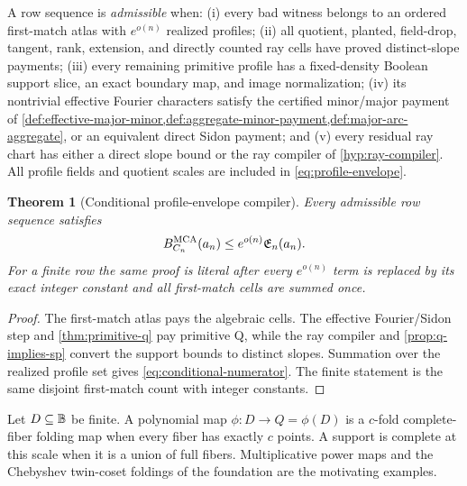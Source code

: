 \documentclass[11pt,a4paper]{amsart}
\numberwithin{equation}{section}
\newtheorem{theorem}{Theorem}[section]
\theoremstyle{remark}
\begin{document}
\begin{definition}\label{def:admissible-sequence}
A row sequence is \emph{admissible} when: (i) every bad witness belongs to an ordered first-match atlas with $e^{o(n)}$ realized profiles; (ii) all quotient, planted, field-drop, tangent, rank, extension, and directly counted ray cells have proved distinct-slope payments; (iii) every remaining primitive profile has a fixed-density Boolean support slice, an exact boundary map, and image normalization; (iv) its nontrivial effective Fourier characters satisfy the certified minor/major payment of \cref{def:effective-major-minor,def:aggregate-minor-payment,def:major-arc-aggregate}, or an equivalent direct Sidon payment; and (v) every residual ray chart has either a direct slope bound or the ray compiler of \cref{hyp:ray-compiler}.  All profile fields and quotient scales are included in \eqref{eq:profile-envelope}.
\end{definition}

\begin{theorem}[Conditional profile-envelope compiler]\label{thm:main-smooth-circle}
Every admissible row sequence satisfies
\begin{equation}
 B_{C_n}^{\rm MCA}(a_n)\le e^{o(n)}\mathfrak E_n(a_n).\label{eq:conditional-numerator}
\end{equation}
For a finite row the same proof is literal after every $e^{o(n)}$ term is replaced by its exact integer constant and all first-match cells are summed once.
\end{theorem}
\begin{proof}
The first-match atlas pays the algebraic cells.  The effective Fourier/Sidon step and \cref{thm:primitive-q} pay primitive Q, while the ray compiler and \cref{prop:q-implies-sp} convert the support bounds to distinct slopes.  Summation over the realized profile set gives \eqref{eq:conditional-numerator}.  The finite statement is the same disjoint first-match count with integer constants.
\end{proof}

\begin{definition}\label{def:structured-folding}
Let $D\subseteq\mathbb B$ be finite.  A polynomial map $\phi:D\to Q=\phi(D)$ is a $c$-fold complete-fiber folding map when every fiber has exactly $c$ points.  A support is complete at this scale when it is a union of full fibers.  Multiplicative power maps and the Chebyshev twin-coset foldings of the foundation \cite[Secs.~7 and 11]{CAP25v132} are the motivating examples.
\end{definition}
\end{document}
